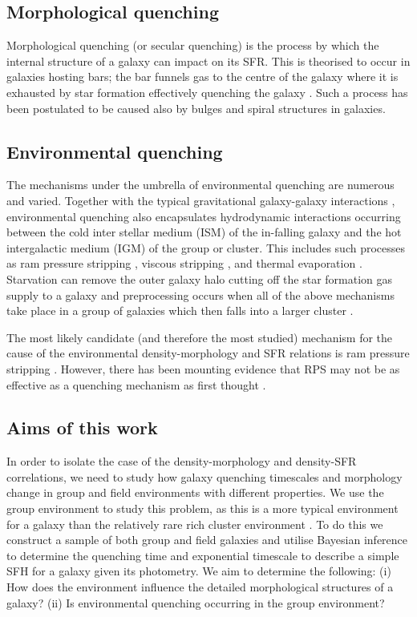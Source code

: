 \documentclass[useAMS,usenatbib]{mn2e}
\begin{document}
\subsection{Morphological quenching}
Morphological quenching (or secular quenching) is the process by which the internal structure of a galaxy can impact on its SFR. This is theorised to occur in galaxies hosting bars; the bar funnels gas to the centre of the galaxy \citep{athanassoula92a} where it is exhausted by star formation effectively quenching the galaxy \citep{sheth05, zurita04, masters10c}. Such a process has been postulated to be caused also by bulges \citep{bluck14} and spiral \citep{hart16} structures in galaxies. 
  
\subsection{Environmental quenching}
The mechanisms under the umbrella of environmental quenching are  numerous and varied. Together with the typical gravitational galaxy-galaxy interactions \citep{moore96}, environmental quenching also encapsulates hydrodynamic interactions occurring between the cold inter stellar medium (ISM) of the in-falling galaxy and the hot intergalactic medium (IGM) of the group or cluster. This includes such processes as ram pressure stripping \citep{gunngott72}, viscous stripping \citep{nulsen82}, and thermal evaporation \citep[a rapid rise in temperature of the ISM due to contact with the IGM;][]{cowie77}. Starvation \citep{larson80} can remove the outer galaxy halo cutting off the star formation gas supply to a galaxy and preprocessing occurs when all of the above mechanisms take place in a group of galaxies which then falls into a larger cluster \citep{dressler04}. 

The most likely candidate (and therefore the most studied) mechanism for the cause of the environmental density-morphology and SFR relations is ram pressure stripping \citep[RPS;][]{abadi99, poggianti99}. However, there has been mounting evidence that RPS may not be as effective as a  quenching mechanism as first thought \citep{emerick16, fillingham16}. 

\subsection{Aims of this work} 
In order to isolate the case of the density-morphology and density-SFR correlations, we need to study how galaxy quenching timescales and morphology change in group and field environments with different properties. We use the group environment to study this problem, as this is a more typical environment for a galaxy than the relatively rare rich cluster environment \citep{carlberg04}. To do this we construct a sample of both group and field galaxies and utilise Bayesian inference to determine the quenching time and exponential timescale to describe a simple SFH for a galaxy given its photometry. We aim to determine the following: (i) How does the environment influence the detailed morphological structures of a galaxy?  (ii) Is environmental quenching occurring in the group environment?
\end{document}
